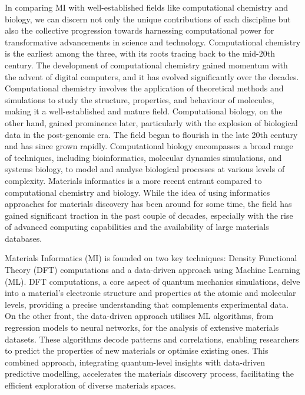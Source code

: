 In comparing MI with well-established fields like computational chemistry and biology, we can discern not only the unique contributions of each discipline but also the collective progression towards harnessing computational power for transformative advancements in science and technology.
Computational chemistry is the earliest among the three, with its roots tracing back to the mid-20th century. The development of computational chemistry gained momentum with the advent of digital computers, and it has evolved significantly over the decades. Computational chemistry involves the application of theoretical methods and simulations to study the structure, properties, and behaviour of molecules, making it a well-established and mature field.
Computational biology, on the other hand, gained prominence later, particularly with the explosion of biological data in the post-genomic era. The field began to flourish in the late 20th century and has since grown rapidly. Computational biology encompasses a broad range of techniques, including bioinformatics, molecular dynamics simulations, and systems biology, to model and analyse biological processes at various levels of complexity.
Materials informatics is a more recent entrant compared to computational chemistry and biology. While the idea of using informatics approaches for materials discovery has been around for some time, the field has gained significant traction in the past couple of decades, especially with the rise of advanced computing capabilities and the availability of large materials databases. 

Materials Informatics (MI) is founded on two key techniques: Density Functional Theory (DFT) computations and a data-driven approach using Machine Learning (ML). DFT computations, a core aspect of quantum mechanics simulations, delve into a material's electronic structure and properties at the atomic and molecular levels, providing a precise understanding that complements experimental data. On the other front, the data-driven approach utilises ML algorithms, from regression models to neural networks, for the analysis of extensive materials datasets. 
These algorithms decode patterns and correlations, enabling researchers to predict the properties of new materials or optimise existing ones. 
This combined approach, integrating quantum-level insights with data-driven predictive modelling, accelerates the materials discovery process, facilitating the efficient exploration of diverse materials spaces.

